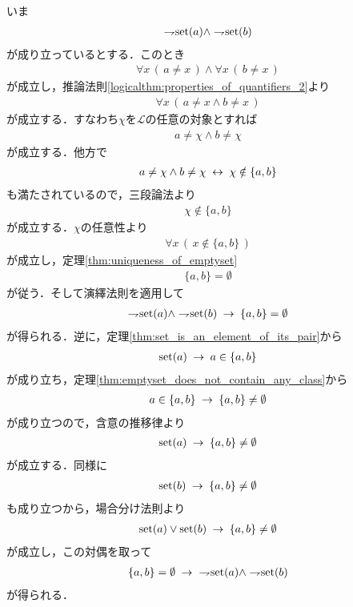 	\begin{sketch}
		いま
		\begin{align}
			\rightharpoondown\hspace{-0.25em} \operatorname*{set} (a) \wedge \rightharpoondown\hspace{-0.25em} \operatorname*{set} (b)
		\end{align}
		が成り立っているとする．このとき
		\begin{align}
			\forall x\, (\, a \neq x\, ) \wedge \forall x\, (\, b \neq x\, )
		\end{align}
		が成立し，推論法則\ref{logicalthm:properties_of_quantifiers_2}より
		\begin{align}
			\forall x\, (\, a \neq x \wedge b \neq x\, )
		\end{align}
		が成立する．すなわち$\chi$を$\mathcal{L}$の任意の対象とすれば
		\begin{align}
			a \neq \chi \wedge b \neq \chi
		\end{align}
		が成立する．他方で
		\begin{align}
			a \neq \chi \wedge b \neq \chi \hspace{0.25em}\leftrightarrow\hspace{0.25em} \chi \notin \{a,b\}
		\end{align}
		も満たされているので，三段論法より
		\begin{align}
			\chi \notin \{a,b\}
		\end{align}
		が成立する．$\chi$の任意性より
		\begin{align}
			\forall x\, (\, x \notin \{a,b\}\, )
		\end{align}
		が成立し，定理\ref{thm:uniqueness_of_emptyset}
		\begin{align}
			\{a,b\} = \emptyset
		\end{align}
		が従う．そして演繹法則を適用して
		\begin{align}
			\rightharpoondown\hspace{-0.25em} \operatorname*{set} (a) \wedge \rightharpoondown\hspace{-0.25em} \operatorname*{set} (b) \hspace{0.25em}\rightarrow\hspace{0.25em} \{a,b\} = \emptyset
		\end{align}
		が得られる．逆に，定理\ref{thm:set_is_an_element_of_its_pair}から
		\begin{align}
			\operatorname*{set} (a) \hspace{0.25em}\rightarrow\hspace{0.25em} a \in \{a,b\}
		\end{align}
		が成り立ち，定理\ref{thm:emptyset_does_not_contain_any_class}から
		\begin{align}
			a \in \{a,b\} \hspace{0.25em}\rightarrow\hspace{0.25em} \{a,b\} \neq \emptyset
		\end{align}
		が成り立つので，含意の推移律より
		\begin{align}
			\operatorname*{set} (a) \hspace{0.25em}\rightarrow\hspace{0.25em} \{a,b\} \neq \emptyset
		\end{align}
		が成立する．同様に
		\begin{align}
			\operatorname*{set} (b) \hspace{0.25em}\rightarrow\hspace{0.25em} \{a,b\} \neq \emptyset
		\end{align}
		も成り立つから，場合分け法則より
		\begin{align}
			\operatorname*{set} (a) \vee \operatorname*{set} (b) \hspace{0.25em}\rightarrow\hspace{0.25em} \{a,b\} \neq \emptyset
		\end{align}
		が成立し，この対偶を取って
		\begin{align}
			\{a,b\} = \emptyset \hspace{0.25em}\rightarrow\hspace{0.25em}\ \rightharpoondown\hspace{-0.25em} \operatorname*{set} (a) \wedge \rightharpoondown\hspace{-0.25em} \operatorname*{set} (b)
		\end{align}
		が得られる．
		\QED
	\end{sketch}
	